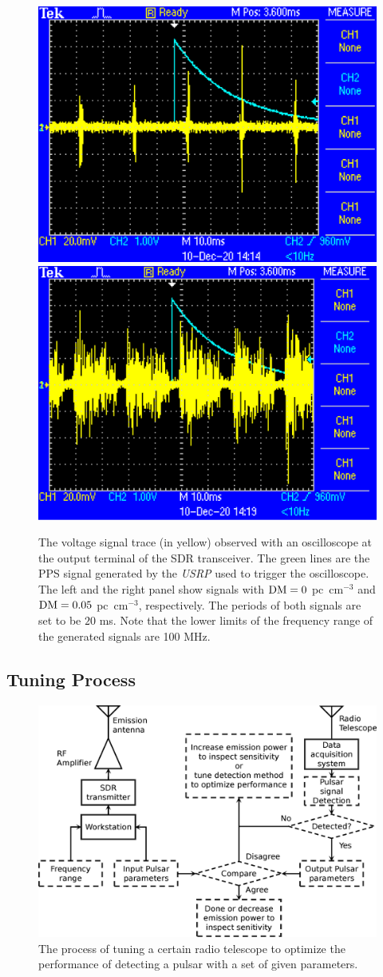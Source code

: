 \documentclass[fleqn,usenatbib]{mnras}
\begin{document}
\begin{figure}
    \centering
    \includegraphics[width=0.45\columnwidth]{dm_0_trace.eps}
    \includegraphics[width=0.45\columnwidth]{dm_0.05_trace.eps}
    \caption{The voltage signal trace (in yellow) observed with an oscilloscope at the output terminal of the SDR transceiver. The green lines are the PPS signal generated by the \textit{USRP} used to trigger the oscilloscope. The left and the right panel show signals with ${\rm DM}=0$ pc~cm$^{-3}$ and ${\rm DM}=0.05$ pc~cm$^{-3}$, respectively. The periods of both signals are set to be $20$ ms. Note that the lower limits of the frequency range of the generated signals are 100 MHz.}
    \label{fig:osc_trace}
\end{figure}

\subsection{Tuning Process}
\begin{figure}
    \centering
    \includegraphics[width=\columnwidth]{tuning.eps}
    \caption{The process of tuning a certain radio telescope to optimize the performance of detecting a pulsar with a set of given parameters.}
    \label{fig:tuning}
\end{figure}
\end{document}
